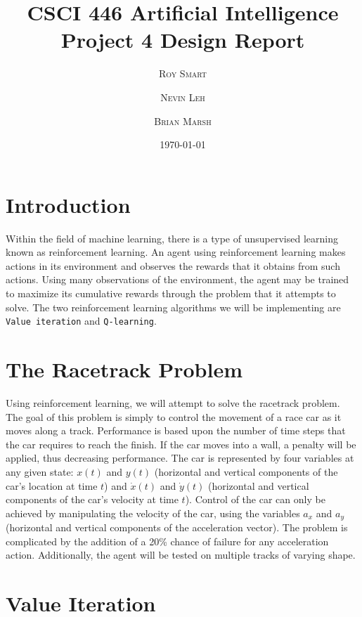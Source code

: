 \documentclass{article}
\title{\vspace{-15mm}\fontsize{24pt}{10pt}\selectfont\textbf{CSCI 446 Artificial Intelligence \\[2mm] Project 4 Design Report} } %
\date{\today}
\author{
\large
\textsc{Roy Smart} \and \textsc{Nevin Leh} \and \textsc{Brian Marsh}\\[2mm] %
}
\begin{document}
	\maketitle %
	\thispagestyle{fancy} %
	\normalsize

	\section{Introduction}
		Within the field of machine learning, there is a type of unsupervised learning known as reinforcement learning.  An agent using reinforcement learning makes actions in its environment and observes the rewards that it obtains from such actions.  Using many observations of the environment, the agent may be trained to maximize its cumulative rewards through the problem that it attempts to solve. The two reinforcement learning algorithms we will be implementing are \texttt{Value iteration} and \texttt{Q-learning}.
	\section{The Racetrack Problem}
		Using reinforcement learning, we will attempt to solve the racetrack problem.  The goal of this problem is simply to control the movement of a race car as it moves along a track.  Performance is based upon the number of time steps that the car requires to reach the finish.  If the car moves into a wall, a penalty will be applied, thus decreasing performance.  The car is represented by four variables at any given state: $x(t)$ and $y(t)$ (horizontal and vertical components of the car's location at time $t$) and $\dot{x}(t)$ and $\dot{y}(t)$ (horizontal and vertical components of the car's velocity at time $t$).  Control of the car can only be achieved by manipulating the velocity of the car, using the variables $a_x$ and $a_y$ (horizontal and vertical components of the acceleration vector).  The problem is complicated by the addition of a 20\% chance of failure for any acceleration action.  Additionally, the agent will be tested on multiple tracks of varying shape.
	\section{Value Iteration}
\end{document}
